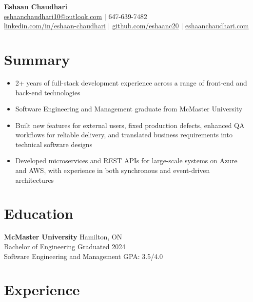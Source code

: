 \documentclass[a4paper,10pt]{article}
\begin{document}
\begin{center}
    {\huge \textbf{Eshaan Chaudhari}}\\[0.5em]

    \faEnvelope\hspace{0.5em}\href{mailto:eshaanchaudhari10@outlook.com}{eshaanchaudhari10@outlook.com} \quad
    $\vert$ \quad
    \faPhone\hspace{0.5em}647-639-7482 \\[0.25em]

    \faLinkedin\hspace{0.5em}\href{https://linkedin.com/in/eshaan-chaudhari}{linkedin.com/in/eshaan-chaudhari} \quad
    $\vert$ \quad
    \faGithub\hspace{0.5em}\href{https://github.com/eshaanc20}{github.com/eshaanc20} \quad
    $\vert$ \quad
    \faGlobe\hspace{0.5em}\href{https://eshaanchaudhari.com}{eshaanchaudhari.com}
\end{center}

\section*{Summary}
\begin{itemize}
    \item 2+ years of full-stack development experience across a range of front-end and back-end technologies
    \item Software Engineering and Management graduate from McMaster University
    \item Built new features for external users, fixed production defects, enhanced QA workflows for reliable delivery, and translated business requirements into technical software designs
    \item Developed microservices and REST APIs for large-scale systems on Azure and AWS, with experience in both synchronous and event-driven architectures
\end{itemize}

\section*{Education}
\textbf{McMaster University} \hfill Hamilton, ON \\
Bachelor of Engineering \hfill Graduated 2024 \\
Software Engineering and Management \hfill GPA: 3.5/4.0

\section*{Experience}
\end{document}
